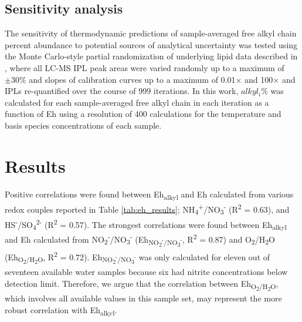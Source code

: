 \subsection{Sensitivity analysis} The sensitivity of thermodynamic predictions of sample-averaged free alkyl chain percent abundance to potential sources of analytical uncertainty was tested using the Monte Carlo-style partial randomization of underlying lipid data described in \cite{boyer2018thermophile}, where all LC-MS IPL peak areas were varied randomly up to a maximum of $\pm30\%$ and slopes of calibration curves up to a maximum of 0.01$\times$ and 100$\times$ and IPLs re-quantified over the course of 999 iterations. In this work, $alkyl_{i}\%$ was calculated for each sample-averaged free alkyl chain in each iteration as a function of Eh using a resolution of 400 calculations for the temperature and basis species concentrations of each sample.

\section{Results}







Positive correlations were found between Eh\textsubscript{alkyl} and Eh calculated from various redox couples reported in Table \ref{tab:eh_results}; NH\textsubscript{4}\textsuperscript{+}/NO\textsubscript{3}\textsuperscript{-} (R\textsuperscript{2} = 0.63), and HS\textsuperscript{-}/SO\textsubscript{4}\textsuperscript{2-} (R\textsuperscript{2} = 0.57). The strongest correlations were found between Eh\textsubscript{alkyl} and Eh calculated from NO\textsubscript{2}\textsuperscript{-}/NO\textsubscript{3}\textsuperscript{-} (Eh\textsubscript{NO\textsubscript{2}\textsuperscript{-}/NO\textsubscript{3}\textsuperscript{-}}, R\textsuperscript{2} = 0.87) and O\textsubscript{2}/H\textsubscript{2}O (Eh\textsubscript{O\textsubscript{2}/H\textsubscript{2}O}, R\textsuperscript{2} = 0.72). Eh\textsubscript{NO\textsubscript{2}\textsuperscript{-}/NO\textsubscript{3}\textsuperscript{-}} was only calculated for eleven out of seventeen available water samples because six had nitrite concentrations below detection limit. Therefore, we argue that the correlation between Eh\textsubscript{O\textsubscript{2}/H\textsubscript{2}O}, which involves all available values in this sample set, may represent the more robust correlation with Eh\textsubscript{alkyl}.



